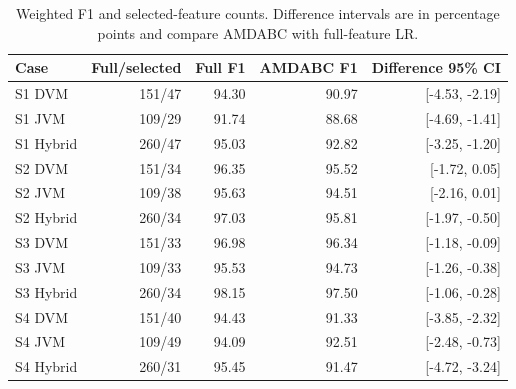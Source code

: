 \begin{table}[htbp]
\centering\small
\caption{Weighted F1 and selected-feature counts. Difference intervals are in percentage points and compare AMDABC with full-feature LR.}\label{tab:rev_f1}
\begin{tabular}{lrrrr}
\hline
Case & Full/selected & Full F1 & AMDABC F1 & Difference 95\% CI \\ \hline
S1 DVM & 151/47 & 94.30 & 90.97 & [-4.53, -2.19] \\
S1 JVM & 109/29 & 91.74 & 88.68 & [-4.69, -1.41] \\
S1 Hybrid & 260/47 & 95.03 & 92.82 & [-3.25, -1.20] \\
S2 DVM & 151/34 & 96.35 & 95.52 & [-1.72, 0.05] \\
S2 JVM & 109/38 & 95.63 & 94.51 & [-2.16, 0.01] \\
S2 Hybrid & 260/34 & 97.03 & 95.81 & [-1.97, -0.50] \\
S3 DVM & 151/33 & 96.98 & 96.34 & [-1.18, -0.09] \\
S3 JVM & 109/33 & 95.53 & 94.73 & [-1.26, -0.38] \\
S3 Hybrid & 260/34 & 98.15 & 97.50 & [-1.06, -0.28] \\
S4 DVM & 151/40 & 94.43 & 91.33 & [-3.85, -2.32] \\
S4 JVM & 109/49 & 94.09 & 92.51 & [-2.48, -0.73] \\
S4 Hybrid & 260/31 & 95.45 & 91.47 & [-4.72, -3.24] \\
\hline
\end{tabular}
\end{table}

